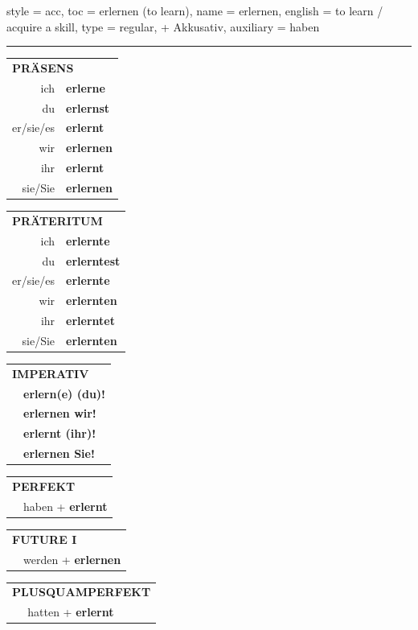 \begin{verbentry}{
  style = {acc},
  toc = {erlernen (to learn)},
  name = {erlernen},
  english = {to learn / acquire a skill},
  type = {regular, + Akkusativ},
  auxiliary = {haben}
}


\vspace{5pt}
\hrule
\vspace{5pt}

\begin{tabular}{rl}
\multicolumn{2}{l}{\textbf{PRÄSENS}}\\
ich & \textbf{erlerne}\\
du & \textbf{erlernst}\\
er/sie/es & \textbf{erlernt}\\
wir & \textbf{erlernen}\\
ihr & \textbf{erlernt}\\
sie/Sie & \textbf{erlernen}\\
\end{tabular}
\hfill
\begin{tabular}{rl}
\multicolumn{2}{l}{\textbf{PRÄTERITUM}}\\
ich & \textbf{erlernte}\\
du & \textbf{erlerntest}\\
er/sie/es & \textbf{erlernte}\\
wir & \textbf{erlernten}\\
ihr & \textbf{erlerntet}\\
sie/Sie & \textbf{erlernten}\\
\end{tabular}
\hfill
\begin{tabular}{rl}
\multicolumn{2}{l}{\textbf{IMPERATIV}}\\
& \textbf{erlern(e) (du)!}\\
& \textbf{erlernen wir!}\\
& \textbf{erlernt (ihr)!}\\
& \textbf{erlernen Sie!}\\
\end{tabular}

\vspace{10pt}

\begin{tabular}{rl}
\multicolumn{2}{l}{\textbf{PERFEKT}}\\
& haben + \textbf{erlernt}\\
\end{tabular}
\hfill
\begin{tabular}{rl}
\multicolumn{2}{l}{\textbf{FUTURE I}}\\
& werden + \textbf{erlernen}\\
\end{tabular}
\hfill
\begin{tabular}{rl}
\multicolumn{2}{l}{\textbf{PLUSQUAMPERFEKT}}\\
& hatten + \textbf{erlernt}\\
\end{tabular}


\end{verbentry}
